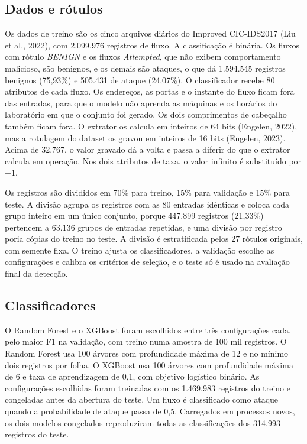 \documentclass[
  article,
  12pt,
  oneside,
  a4paper,
  english,
  brazil
]{abntex2}
\begin{document}
\subsection{Dados e rótulos}

Os dados de treino são os cinco arquivos diários do Improved CIC-IDS2017 (Liu et al., 2022), com
2.099.976 registros de fluxo. A classificação é binária. Os fluxos com rótulo \emph{BENIGN} e os
fluxos \emph{Attempted}, que não exibem comportamento malicioso, são benignos, e os demais são
ataques, o que dá 1.594.545 registros benignos (75,93\%) e 505.431 de ataque (24,07\%). O
classificador recebe 80 atributos de cada fluxo. Os endereços, as portas e o instante do fluxo
ficam fora das entradas, para que o modelo não aprenda as máquinas e os horários do laboratório em
que o conjunto foi gerado. Os dois comprimentos de cabeçalho também ficam fora. O extrator os calcula em inteiros de 64 bits
(Engelen, 2022), mas a rotulagem do dataset os gravou em inteiros de 16 bits (Engelen, 2023). Acima
de 32.767, o valor gravado dá a volta e passa a diferir do que o extrator calcula em operação. Nos dois atributos de taxa, o valor infinito é
substituído por $-1$.

Os registros são divididos em 70\% para treino, 15\% para validação e 15\% para teste. A divisão
agrupa os registros com as 80 entradas idênticas e coloca cada grupo inteiro em um único conjunto,
porque 447.899 registros (21,33\%) pertencem a 63.136 grupos de entradas repetidas, e uma divisão
por registro poria cópias do treino no teste. A divisão é estratificada pelos 27 rótulos originais,
com semente fixa. O treino ajusta os classificadores, a validação escolhe as configurações e
calibra os critérios de seleção, e o teste só é usado na avaliação final da detecção.

\subsection{Classificadores}

O Random Forest e o XGBoost foram escolhidos entre três configurações cada, pelo maior F1 na
validação, com treino numa amostra de 100 mil registros. O Random Forest usa 100 árvores com
profundidade máxima de 12 e no mínimo dois registros por folha. O XGBoost usa 100 árvores com
profundidade máxima de 6 e taxa de aprendizagem de 0,1, com objetivo logístico binário. As
configurações escolhidas foram treinadas com os 1.469.983 registros do treino e congeladas antes da
abertura do teste. Um fluxo é classificado como ataque quando a probabilidade de ataque passa de
0,5. Carregados em processos novos, os dois modelos congelados reproduziram todas as classificações
dos 314.993 registros do teste.
\end{document}
